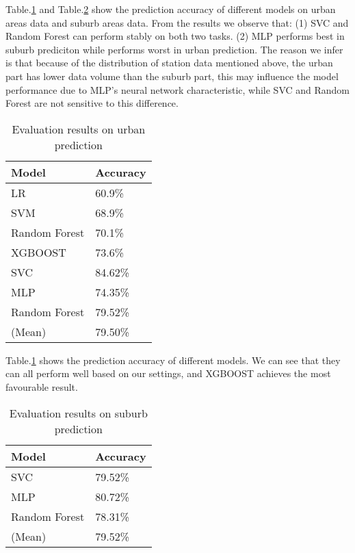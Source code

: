 Table.\ref{tab2} and Table.\ref{tab3} show the prediction accuracy of different models on urban areas data and suburb areas data. From the results we observe that: (1) SVC and Random Forest can perform stably on both two tasks. (2) MLP performs best in suburb prediciton while performs worst in urban prediction. The reason we infer is that because of the distribution of station data mentioned above, the urban part has lower data volume than the suburb part, this may influence the model performance due to MLP's neural network characteristic, while SVC and Random Forest are not sensitive to this difference.
\begin{table}[htbp]
	\caption{Evaluation results on urban prediction}
	\begin{center}
		\begin{tabular}{|l|l|}
			\hline
			Model & Accuracy\\
			\hline
			LR & 60.9\%\\
			\hline
			SVM & 68.9\%\\
			\hline
			Random Forest & 70.1\%\\
			\hline
			XGBOOST & 73.6\%\\
			SVC & 84.62\%\\
			\hline
			MLP & 74.35\%\\
			\hline
			Random Forest & 79.52\%\\
			\hline
			(Mean) & 79.50\%\\
			\hline
		\end{tabular}
		\label{tab2}
	\end{center}
\end{table}
Table.\ref{tab2} shows the prediction accuracy of different models. We can see that they can all perform well based on our settings, and XGBOOST achieves the most favourable result.

\begin{table}[htbp]
	\caption{Evaluation results on suburb prediction}
	\begin{center}
		\begin{tabular}{|l|l|}
			\hline
			Model & Accuracy\\
			\hline
			SVC & 79.52\%\\
			\hline
			MLP & 80.72\%\\
			\hline
			Random Forest & 78.31\%\\
			\hline
			(Mean) & 79.52\%\\
			\hline
		\end{tabular}
		\label{tab3}
	\end{center}
\end{table}

